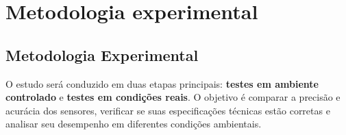 \chapter{Metodologia experimental}\label{cap:metodologia}



















\section{Metodologia Experimental}
O estudo será conduzido em duas etapas principais: \textbf{testes em ambiente controlado} e \textbf{testes em condições reais}. O objetivo é comparar a precisão e acurácia dos sensores, verificar se suas especificações técnicas estão corretas e analisar seu desempenho em diferentes condições ambientais.

